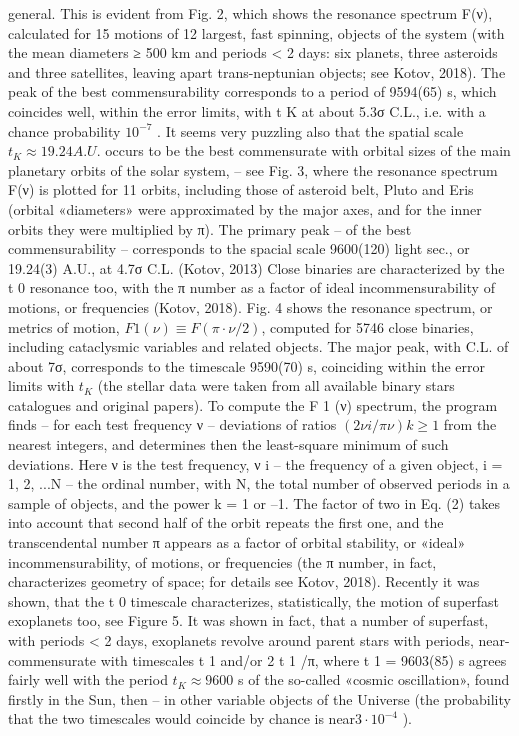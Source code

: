 general.
This is evident from Fig. 2, which shows the resonance spectrum F(ν), calculated for 15
motions of 12 largest, fast spinning, objects of the system (with the mean diameters ≥ 500 km and
periods < 2 days: six planets, three asteroids and three satellites, leaving apart trans-neptunian
objects; see Kotov, 2018). The peak of the best commensurability corresponds to a period of
9594(65) s, which coincides well, within the error limits, with t K at about 5.3σ C.L., i.e. with a
chance probability $10^{-7}$ .
It seems very puzzling also that the spatial scale $t_K ≈ 19.24 A.U.$ occurs to be the best
commensurate with orbital sizes of the main planetary orbits of the solar system, – see Fig. 3,
where the resonance spectrum F(ν) is plotted for 11 orbits, including those of asteroid belt, Pluto
and Eris (orbital «diameters» were approximated by the major axes, and for the inner orbits they
were multiplied by π). The primary peak – of the best commensurability – corresponds to the
spacial scale 9600(120) light sec., or 19.24(3) A.U., at 4.7σ C.L. (Kotov, 2013)
Close binaries are characterized by the t 0 resonance too, with the π number as a factor of ideal
incommensurability of motions, or frequencies (Kotov, 2018). Fig. 4 shows the resonance spectrum,
or metrics of motion, $F 1 (ν) ≡ F(\pi \cdot ν/2)$, computed for 5746 close binaries, including cataclysmic
variables and related objects. The major peak, with C.L. of about 7σ, corresponds to the timescale
9590(70) s, coinciding within the error limits with $t_K$ (the stellar data were taken from all available
binary stars catalogues and original papers).
To compute the F 1 (ν) spectrum, the program finds – for each test frequency ν – deviations of
ratios $(2ν i /\pi ν) k ≥ 1$ from the nearest integers, and determines then the least-square minimum of such
deviations. Here ν is the test frequency, ν i – the frequency of a given object, i = 1, 2, ...N – the
ordinal number, with N, the total number of observed periods in a sample of objects, and the power
k = 1 or –1. The factor of two in Eq. (2) takes into account that second half of the orbit repeats the
first one, and the transcendental number π appears as a factor of orbital stability, or «ideal»
incommensurability, of motions, or frequencies (the π number, in fact, characterizes geometry of
space; for details see Kotov, 2018).
Recently it was shown, that the t 0 timescale characterizes, statistically, the motion of superfast
exoplanets too, see Figure 5.
It was shown in fact, that a number of superfast, with periods < 2 days, exoplanets revolve
around parent stars with periods, near-commensurate with timescales t 1 and/or 2 t 1 /π, where t 1 =
9603(85) s agrees fairly well with the period $t_K ≈ 9600$ s of the so-called «cosmic oscillation», found
firstly in the Sun, then – in other variable objects of the Universe (the probability that the two
timescales would coincide by chance is near$3 \cdot 10^{-4}$ ).

